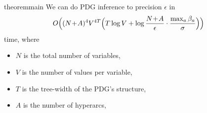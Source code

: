 \documentclass{article}
\newcommand\zogamma{{\bar\gamma}}
\begin{document}
\begin{linked}{theorem}{main}
    We can do
    PDG inference
    to precision 
    $\epsilon$ in 
    \[ 
    O\pqty[\Big]{  (N\!+\!A)^4 V^{4T}
        \pqty[\Big]{ T \log V + \log \frac{N\!+\! A}{\epsilon} 
    \cdot \frac{\max_a \beta_a}{\sigma}
        } }%
    \]
    time,
    \unskip{}
    where
    \begin{itemize}[nosep,%
            ]
        \item $N$ is the total number of variables,
        \item $V$ is the number of values per variable,
        \item $T$ is the tree-width of the PDG's structure,
        \item $A$ is the number of hyperarcs, 

\end{itemize}
\end{linked}
\end{document}
